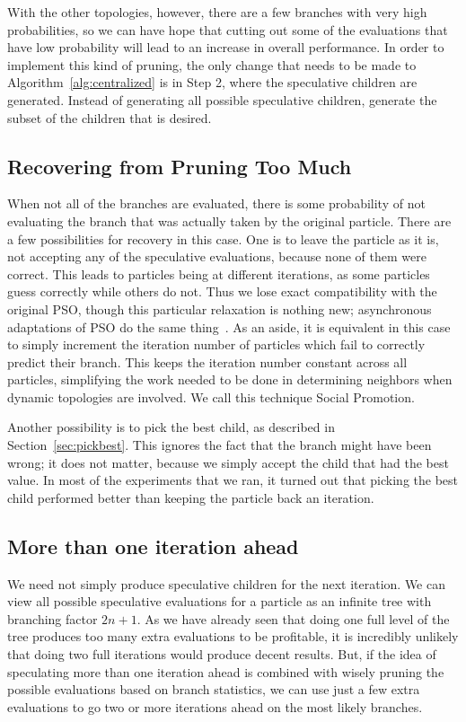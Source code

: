 \documentclass[smallcondensed]{svjour3}
\renewcommand{\sec}[1]{Section~\ref{sec:#1}}
\newcommand{\alg}[1]{Algorithm~\ref{alg:#1}}
\begin{document}
With the other topologies, however, there are a few branches with very high
probabilities, so we can have hope that cutting out some of the evaluations
that have low probability will lead to an increase in overall performance.  In
order to implement this kind of pruning, the only change that needs to be made
to \alg{centralized} is in Step 2, where the speculative children are
generated.  Instead of generating all possible speculative children, generate
the subset of the children that is desired.

\subsection{Recovering from Pruning Too Much}
\label{sec:wrong}

When not all of the branches are evaluated, there is some probability of not
evaluating the branch that was actually taken by the original particle.  There
are a few possibilities for recovery in this case.  One is to leave the
particle as it is, not accepting any of the speculative evaluations, because
none of them were correct.  This leads to particles being at different
iterations, as some particles guess correctly while others do not.  Thus we
lose exact compatibility with the original PSO, though this particular
relaxation is nothing new; asynchronous adaptations of PSO do the same
thing~\citep{koh-2006-parallel-asynchronous-pso}.  As an aside, it is equivalent
in this case to simply increment the iteration number of particles which fail
to correctly predict their branch.  This keeps the iteration number constant
across all particles, simplifying the work needed to be done in determining
neighbors when dynamic topologies are involved.  We call this technique Social
Promotion.

Another possibility is to pick the best child, as described in \sec{pickbest}.
This ignores the fact that the branch might have been wrong; it does not
matter, because we simply accept the child that had the best value.  In most of
the experiments that we ran, it turned out that picking the best child
performed better than keeping the particle back an iteration.

\subsection{More than one iteration ahead}
\label{sec:manyiters}

We need not simply produce speculative children for the next iteration.  We can
view all possible speculative evaluations for a particle as an infinite tree
with branching factor $2n+1$.  As we have already seen that doing one full
level of the tree produces too many extra evaluations to be profitable, it is
incredibly unlikely that doing two full iterations would produce decent
results.  But, if the idea of speculating more than one iteration ahead is
combined with wisely pruning the possible evaluations based on branch
statistics, we can use just a few extra evaluations to go two or more
iterations ahead on the most likely branches.
\end{document}
